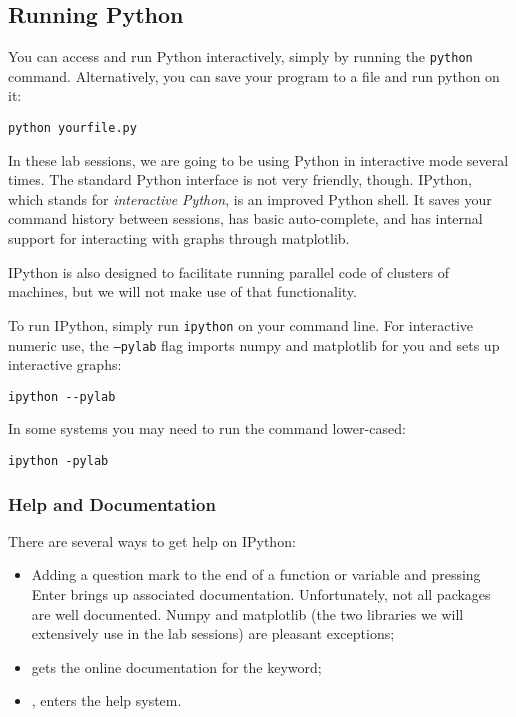 \subsection{Running Python}

You can access and run Python interactively, simply by running the
\texttt{python} command. Alternatively, you can save your program to a file
and run python on it:

\begin{verbatim}
python yourfile.py
\end{verbatim}

In these lab sessions, we are going to be using Python in interactive mode
several times. The standard Python interface is not very friendly, though.
IPython, which stands for \emph{interactive Python}, is an improved Python
shell. It saves your command history between sessions, has basic auto-complete,
and has internal support for interacting with graphs through matplotlib.

IPython is also designed to facilitate running parallel code of clusters of
machines, but we will not make use of that functionality.

To run IPython, simply run \texttt{ipython} on your command line. For
interactive numeric use, the \texttt{--pylab} flag imports numpy and matplotlib
for you and sets up interactive graphs:

\begin{verbatim}
ipython --pylab
\end{verbatim}

In some systems you may need to run the command lower-cased:

\begin{verbatim}
ipython -pylab
\end{verbatim}

\subsubsection{Help and Documentation}

There are several ways to get help on IPython:

\begin{itemize}
\item Adding a question mark to the end of a function or variable and pressing Enter brings up associated documentation. Unfortunately, not all packages are well documented. Numpy and matplotlib (the two libraries we will extensively use in the lab sessions) are pleasant exceptions;
\item {} gets the online documentation for the  keyword;
\item {}, enters the help system.
\end{itemize}


